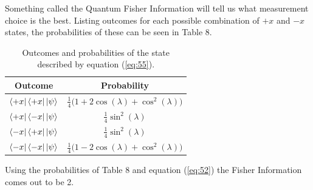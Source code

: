 \documentclass[twocolumn]{article}
\begin{document}
Something called the Quantum Fisher Information will tell us what measurement choice is the best. Listing outcomes for each possible combination of $+x$ and $-x$ states, the probabilities of these can be seen in Table 8.
\newpage
\begin{table}[h!]
\begin{center}
\begin{tabular}{ |c|c| }
\hline Outcome & Probability \\
\hline $\bra{+x}\bra{+x}\ket{\psi}$ & $\frac{1}{4}\big(1+2\cos{(\lambda)}+\cos^2{(\lambda)}\big)$ \\
\hline $\bra{+x}\bra{-x}\ket{\psi}$ & $\frac{1}{4}\sin^2{(\lambda)}$ \\
\hline $\bra{-x}\bra{+x}\ket{\psi}$ & $\frac{1}{4}\sin^2{(\lambda)}$ \\
\hline $\bra{-x}\bra{-x}\ket{\psi}$ & $\frac{1}{4}\big(1-2\cos{(\lambda)}+\cos^2{(\lambda)}\big)$ \\
\hline
\end{tabular}
\caption{Outcomes and probabilities of the state described by equation (\ref{eq:55}).}
\end{center}
\end{table} 
Using the probabilities of Table 8 and equation (\ref{eq:52}) the Fisher Information comes out to be 2. 
\end{document}
